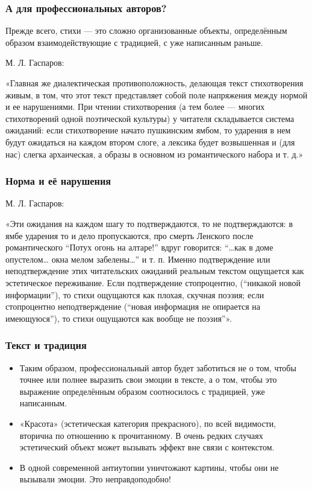 \documentclass{beamer}
\begin{document}

\begin{frame}
\frametitle{А для профессиональных авторов?}
\begin{flushleft}
Прежде всего, стихи — это сложно организованные объекты, определённым образом взаимодействующие с традицией, с уже написанным раньше.
\end{flushleft}


М. Л. Гаспаров:

«Главная же диалектическая противоположность, делающая текст стихотворения живым, в том, что этот текст представляет собой поле напряжения между нормой и ее нарушениями. При чтении стихотворения (а тем более — многих стихотворений одной поэтической культуры) у читателя складывается система ожиданий: если стихотворение начато пушкинским ямбом, то ударения в нем будут ожидаться на каждом втором слоге, а лексика будет возвышенная и (для нас) слегка архаическая, а образы в основном из романтического набора и т. д.»
\end{frame}


\begin{frame}
\frametitle{Норма и её нарушения}
М. Л. Гаспаров:

«Эти ожидания на каждом шагу то подтверждаются, то не подтверждаются: в ямбе ударения то и дело пропускаются, про смерть Ленского после романтического “Потух огонь на алтаре!” вдруг говорится: “…как в доме опустелом… окна мелом забелены…” и т. п. Именно подтверждение или неподтверждение этих читательских ожиданий реальным текстом ощущается как эстетическое переживание. Если подтверждение стопроцентно, (“никакой новой информации”), то стихи ощущаются как плохая, скучная поэзия; если стопроцентно неподтверждение (“новая информация не опирается на имеющуюся”), то стихи ощущаются как вообще не поэзия”». 
\end{frame}


\begin{frame}
\frametitle{Текст и традиция}
\begin{itemize}
\item Таким образом, профессиональный автор будет заботиться не о том, чтобы точнее или полнее выразить свои эмоции в тексте, а о том, чтобы это выражение определённым образом соотносилось с традицией, уже написанным. 

\item «Красота» (эстетическая категория прекрасного), по всей видимости, вторична по отношению к прочитанному. В очень редких случаях эстетический объект может вызывать эффект вне связи с контекстом.

\item В одной современной антиутопии уничтожают картины, чтобы они не вызывали эмоции. Это неправдоподобно!

\end{itemize}

\end{frame}
\end{document}
